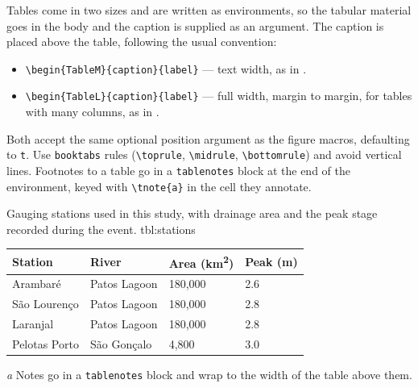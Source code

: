 Tables come in two sizes and are written as environments, so the
tabular material goes in the body and the caption is supplied as
an argument. The caption is placed above the table, following the
usual convention:

\begin{itemize}
  \item \verb|\begin{TableM}{caption}{label}| --- text width,
        as in .
  \item \verb|\begin{TableL}{caption}{label}| --- full width,
        margin to margin, for tables with many columns, as in
        .
\end{itemize}

Both accept the same optional position argument as the figure
macros, defaulting to \texttt{t}. Use \texttt{booktabs} rules
(\verb|\toprule|, \verb|\midrule|, \verb|\bottomrule|) and avoid
vertical lines. Footnotes to a table go in a \verb|tablenotes|
block at the end of the environment, keyed with \verb|\tnote{a}|
in the cell they annotate.

\begin{TableM}{%
  Gauging stations used in this study, with drainage area and the
  peak stage recorded during the event.%
}{tbl:stations}
\scriptsize
\sffamily
\begin{tabularx}{\linewidth}{LLLL}
\toprule
\textbf{Station} & \textbf{River} & \textbf{Area (km\textsuperscript{2})} & \textbf{Peak (m)} \\
\midrule
Arambaré          & Patos Lagoon  & 180{,}000 & 2.6 \\
São Lourenço      & Patos Lagoon  & 180{,}000 & 2.8 \\
Laranjal          & Patos Lagoon  & 180{,}000 & 2.8 \\
Pelotas Porto     & São Gonçalo   &  4{,}800  & 3.0 \\
\bottomrule
\end{tabularx}
\begin{tablenotes}
  \item[\textit{a}] Notes go in a \texttt{tablenotes} block and
  wrap to the width of the table above them.
\end{tablenotes}
\end{TableM}

\lipsum[11-13]

